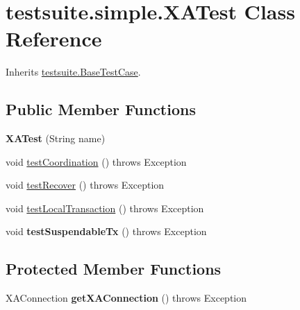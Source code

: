 \hypertarget{classtestsuite_1_1simple_1_1_x_a_test}{}\section{testsuite.\+simple.\+X\+A\+Test Class Reference}
\label{classtestsuite_1_1simple_1_1_x_a_test}


Inherits \mbox{\hyperlink{classtestsuite_1_1_base_test_case}{testsuite.\+Base\+Test\+Case}}.

\subsection*{Public Member Functions}
\begin{DoxyCompactItemize}
\item 
\mbox{\label{classtestsuite_1_1simple_1_1_x_a_test_ab9bf087db2550571c63bb6f3d8dc31d9}} 
{\bfseries X\+A\+Test} (String name)
\item 
void \mbox{\hyperlink{classtestsuite_1_1simple_1_1_x_a_test_ac5d7e1565f556c03ca6ba2a11a6de5fa}{test\+Coordination}} ()  throws Exception 
\item 
void \mbox{\hyperlink{classtestsuite_1_1simple_1_1_x_a_test_aa3b48d0aaeb44cc191cba70d70e16234}{test\+Recover}} ()  throws Exception 
\item 
void \mbox{\hyperlink{classtestsuite_1_1simple_1_1_x_a_test_aeb2dc398d807c4028e784f85aba58457}{test\+Local\+Transaction}} ()  throws Exception 
\item 
\mbox{\label{classtestsuite_1_1simple_1_1_x_a_test_a81909386fefd2283e02aa376525f6fd7}} 
void {\bfseries test\+Suspendable\+Tx} ()  throws Exception 
\end{DoxyCompactItemize}
\subsection*{Protected Member Functions}
\begin{DoxyCompactItemize}
\item 
\mbox{\label{classtestsuite_1_1simple_1_1_x_a_test_ad6e5c8d3fc2f2bff1cbb0712db804ca8}} 
X\+A\+Connection {\bfseries get\+X\+A\+Connection} ()  throws Exception 
\end{DoxyCompactItemize}
